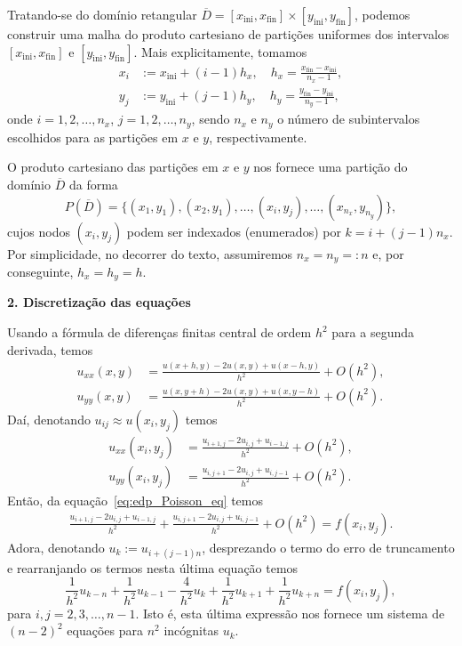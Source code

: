 Tratando-se do domínio retangular $\overline{D} = [x_{\text{ini}}, x_{\text{fin}}]\times [y_{\text{ini}}, y_{\text{fin}}]$, podemos construir uma malha do produto cartesiano de partições uniformes dos intervalos $[x_{\text{ini}}, x_{\text{fin}}]$ e $[y_{\text{ini}}, y_{\text{fin}}]$. Mais explicitamente, tomamos
\begin{align}
  x_{i} &:= x_{\text{ini}} + (i-1)h_x,\quad h_x = \frac{x_{\text{fin}}-x_{\text{ini}}}{n_x-1},\\
  y_{j} &:= y_{\text{ini}} + (j-1)h_y,\quad h_y = \frac{y_{\text{fin}}-y_{\text{ini}}}{n_y-1},  
\end{align}
onde $i = 1, 2, \dotsc, n_x$, $j = 1, 2, \dotsc, n_y$, sendo $n_x$ e $n_y$ o número de subintervalos escolhidos para as partições em $x$ e $y$, respectivamente.

O produto cartesiano das partições em $x$ e $y$ nos fornece uma partição do domínio $\overline{D}$ da forma
\begin{equation}
  P(\overline{D}) = \{(x_1, y_1), (x_2, y_1), \dotsc, (x_i, y_j), \dotsc, (x_{n_x}, y_{n_y})\},
\end{equation}
cujos nodos $(x_i, y_j)$ podem ser indexados (enumerados) por $k = i + (j-1)n_x$.  Por simplicidade, no decorrer do texto, assumiremos $n_x=n_y=:n$ e, por conseguinte, $h_x=h_y=h$.

\begin{flushleft}
  {\bf 2. Discretização das equações}
\end{flushleft}

Usando a fórmula de diferenças finitas central de ordem $h^2$ para a segunda derivada, temos
\begin{align}
  u_{xx}(x,y) &= \frac{u(x+h,y)-2u(x,y)+u(x-h,y)}{h^2} + O(h^2),\\
  u_{yy}(x,y) &= \frac{u(x,y+h)-2u(x,y)+u(x,y-h)}{h^2} + O(h^2).
\end{align}
Daí, denotando $u_{ij}\approx u(x_i, y_j)$ temos
\begin{align}
  u_{xx}(x_i,y_j) &= \frac{u_{i+1,j}-2u_{i,j}+u_{i-1,j}}{h^2} + O(h^2),\\
  u_{yy}(x_i,y_j) &= \frac{u_{i,j+1}-2u_{i,j}+u_{i,j-1}}{h^2} + O(h^2).  
\end{align}
Então, da equação~\ref{eq:edp_Poisson_eq} temos
\begin{align}
  \frac{u_{i+1,j}-2u_{i,j}+u_{i-1,j}}{h^2} + \frac{u_{i,j+1}-2u_{i,j}+u_{i,j-1}}{h^2} + O(h^2) = f(x_i,y_j).
\end{align}
Adora, denotando $u_k := u_{i+(j-1)n}$, desprezando o termo do erro de truncamento e rearranjando os termos nesta última equação temos
\begin{equation}\label{eq:edp_Poisson_mdf_sis0}
  \frac{1}{h^2}u_{k-n} + \frac{1}{h^2}u_{k-1} -\frac{4}{h^2}u_{k} + \frac{1}{h^2}u_{k+1} + \frac{1}{h^2}u_{k+n} = f(x_i,y_j),
\end{equation}
para $i,j=2, 3, \dotsc, n-1$. Isto é, esta última expressão nos fornece um sistema de $(n-2)^2$ equações para $n^2$ incógnitas $u_k$.

